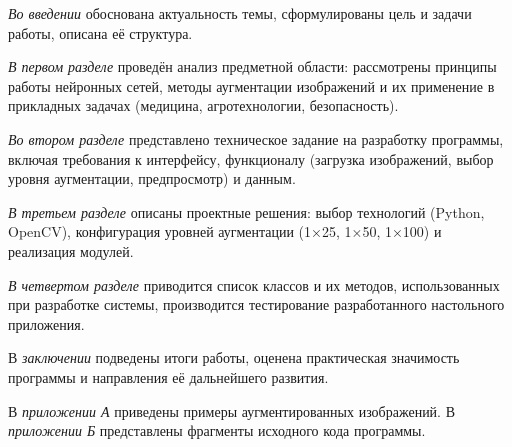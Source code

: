 \emph{Во введении} обоснована актуальность темы, сформулированы цель и задачи работы, описана её структура.

\emph{В первом разделе} проведён анализ предметной области: рассмотрены принципы работы нейронных сетей, методы аугментации изображений и их применение в прикладных задачах (медицина, агротехнологии, безопасность).

\emph{Во втором разделе} представлено техническое задание на разработку программы, включая требования к интерфейсу, функционалу (загрузка изображений, выбор уровня аугментации, предпросмотр) и данным.

\emph{В третьем разделе} описаны проектные решения: выбор технологий (Python, OpenCV), конфигурация уровней аугментации (1×25, 1×50, 1×100) и реализация модулей.

\emph{В четвертом разделе} приводится список классов и их методов, использованных при разработке системы, производится тестирование разработанного настольного приложения.

В \emph{заключении} подведены итоги работы, оценена практическая значимость программы и направления её дальнейшего развития.

В \emph{приложении А} приведены примеры аугментированных изображений.
В \emph{приложении Б} представлены фрагменты исходного кода программы. 
